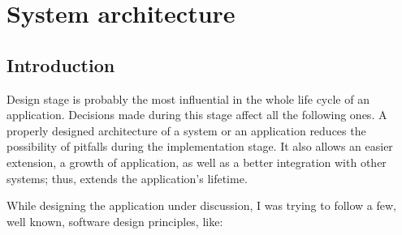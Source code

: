 %


\chapter{System architecture}
\label{cha:sys_arch}


\section{Introduction}
\label{sec:gui}

Design stage is probably the most influential in the whole life cycle of an application. Decisions made during this stage affect all the following ones. A properly designed architecture of a system or an application reduces the possibility of pitfalls during the implementation stage. It also allows an easier extension, a growth of application, as well as a better integration with other systems; thus, extends the application\rq{}s lifetime.

While designing the application under discussion, I was trying to follow a few, well known, software design principles, like:

